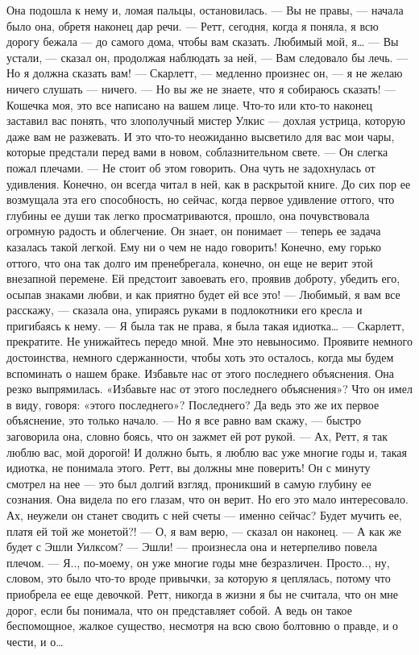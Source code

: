 Она подошла к нему и, ломая пальцы, остановилась.
— Вы не правы, — начала было она, обретя наконец дар речи. — Ретт, сегодня, когда я поняла, я всю дорогу бежала — до самого дома, чтобы вам сказать. Любимый мой, я…
— Вы устали, — сказал он, продолжая наблюдать за ней, — Вам следовало бы лечь.
— Но я должна сказать вам!
— Скарлетт, — медленно произнес он, — я не желаю ничего слушать — ничего.
— Но вы же не знаете, что я собираюсь сказать!
— Кошечка моя, это все написано на вашем лице. Что-то или кто-то наконец заставил вас понять, что злополучный мистер Улкис — дохлая устрица, которую даже вам не разжевать. И это что-то неожиданно высветило для вас мои чары, которые предстали перед вами в новом, соблазнительном свете. — Он слегка пожал плечами. — Не стоит об этом говорить.
Она чуть не задохнулась от удивления. Конечно, он всегда читал в ней, как в раскрытой книге. До сих пор ее возмущала эта его способность, но сейчас, когда первое удивление оттого, что глубины ее души так легко просматриваются, прошло, она почувствовала огромную радость и облегчение. Он знает, он понимает — теперь ее задача казалась такой легкой. Ему ни о чем не надо говорить! Конечно, ему горько оттого, что она так долго им пренебрегала, конечно, он еще не верит этой внезапной перемене. Ей предстоит завоевать его, проявив доброту, убедить его, осыпав знаками любви, и как приятно будет ей все это!
— Любимый, я вам все расскажу, — сказала она, упираясь руками в подлокотники его кресла и пригибаясь к нему. — Я была так не права, я была такая идиотка…
— Скарлетт, прекратите. Не унижайтесь передо мной. Мне это невыносимо. Проявите немного достоинства, немного сдержанности, чтобы хоть это осталось, когда мы будем вспоминать о нашем браке. Избавьте нас от этого последнего объяснения.
Она резко выпрямилась. «Избавьте нас от этого последнего объяснения»? Что он имел в виду, говоря: «этого последнего»? Последнего? Да ведь это же их первое объяснение, это только начало.
— Но я все равно вам скажу, — быстро заговорила она, словно боясь, что он зажмет ей рот рукой. — Ах, Ретт, я так люблю вас, мой дорогой! И должно быть, я люблю вас уже многие годы и, такая идиотка, не понимала этого. Ретт, вы должны мне поверить!
Он с минуту смотрел на нее — это был долгий взгляд, проникший в самую глубину ее сознания. Она видела по его глазам, что он верит. Но его это мало интересовало. Ах, неужели он станет сводить с ней счеты — именно сейчас? Будет мучить ее, платя ей той же монетой?!
— О, я вам верю, — сказал он наконец. — А как же будет с Эшли Уилксом?
— Эшли! — произнесла она и нетерпеливо повела плечом. — Я.., по-моему, он уже многие годы мне безразличен. Просто.., ну, словом, это было что-то вроде привычки, за которую я цеплялась, потому что приобрела ее еще девочкой. Ретт, никогда в жизни я бы не считала, что он мне дорог, если бы понимала, что он представляет собой. А ведь он такое беспомощное, жалкое существо, несмотря на всю свою болтовню о правде, и о чести, и о…

